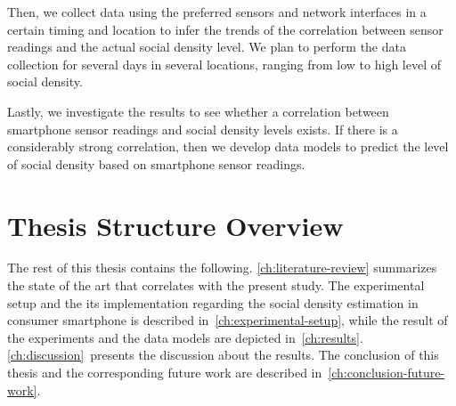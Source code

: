	Then, we collect data using the preferred sensors and network interfaces in a certain timing and location to infer the trends of the correlation between sensor readings and the actual social density level. We plan to perform the data collection for several days in several locations, ranging from low to high level of social density.

	Lastly, we investigate the results to see whether a correlation between smartphone sensor readings and social density levels exists. If there is a considerably strong correlation, then we develop data models to predict the level of social density based on smartphone sensor readings.


\section{Thesis Structure Overview} %
\label{sec:thesis_overview}
The rest of this thesis contains the following.
\autoref{ch:literature-review} summarizes the state of the art that correlates with the present study. The experimental setup and the its implementation regarding the social density estimation in consumer smartphone is described in~\autoref{ch:experimental-setup}, while the result of the experiments and the data models are depicted in~\autoref{ch:results}. \autoref{ch:discussion}~presents the discussion about the results. The conclusion of this thesis and the corresponding future work are described in~\autoref{ch:conclusion-future-work}.





